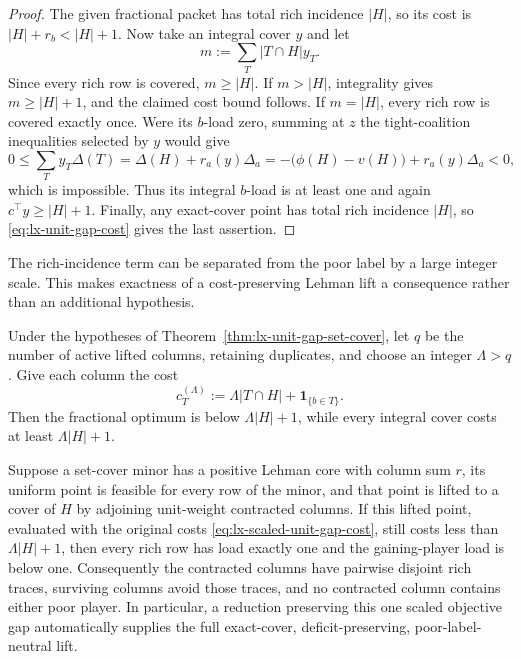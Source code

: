 \begin{proof}
The given fractional packet has total rich incidence $|H|$, so its cost is
$|H|+r_b<|H|+1$.  Now take an integral cover $y$ and let
\[
 m:=\sum_T|T\cap H|y_T.
\]
Since every rich row is covered, $m\geq|H|$.  If $m>|H|$, integrality gives
$m\geq|H|+1$, and the claimed cost bound follows.  If $m=|H|$, every rich
row is covered exactly once.  Were its $b$-load zero, summing at $z$ the
tight-coalition inequalities selected by $y$ would give
\[
 0\leq\sum_Ty_T\Delta(T)
   =\Delta(H)+r_a(y)\Delta_a
   =-\bigl(\phi(H)-v(H)\bigr)+r_a(y)\Delta_a<0,
\]
which is impossible.  Thus its integral $b$-load is at least one and again
$c^\top y\geq|H|+1$.  Finally, any exact-cover point has total rich
incidence $|H|$, so \eqref{eq:lx-unit-gap-cost} gives the last assertion.
\end{proof}

The rich-incidence term can be separated from the poor label by a large
integer scale.  This makes exactness of a cost-preserving Lehman lift a
consequence rather than an additional hypothesis.

\begin{corollary}
\label{cor:lx-scale-separated-exactness}
Under the hypotheses of Theorem~\ref{thm:lx-unit-gap-set-cover}, let $q$ be
the number of active lifted columns, retaining duplicates, and choose an
integer $\Lambda>q$.  Give each column the cost
\[
 c_T^{(\Lambda)}:=\Lambda|T\cap H|+
                    \mathbf1_{\{b\in T\}}.          \tag{UG-M1}
 \label{eq:lx-scaled-unit-gap-cost}
\]
Then the fractional optimum is below $\Lambda|H|+1$, while every integral
cover costs at least $\Lambda|H|+1$.

Suppose a set-cover minor has a positive Lehman core with column sum $r$,
its uniform point is feasible for every row of the minor, and that point is
lifted to a cover of $H$ by adjoining unit-weight contracted columns.  If
this lifted point, evaluated with the original costs
\eqref{eq:lx-scaled-unit-gap-cost}, still costs less than
$\Lambda|H|+1$, then every rich row has load exactly one and the
gaining-player load is below one.  Consequently the contracted columns have
pairwise disjoint rich traces, surviving columns avoid those traces, and no
contracted column contains either poor player.  In particular, a reduction
preserving this one scaled objective gap automatically supplies the full
exact-cover, deficit-preserving, poor-label-neutral lift.
\end{corollary}

